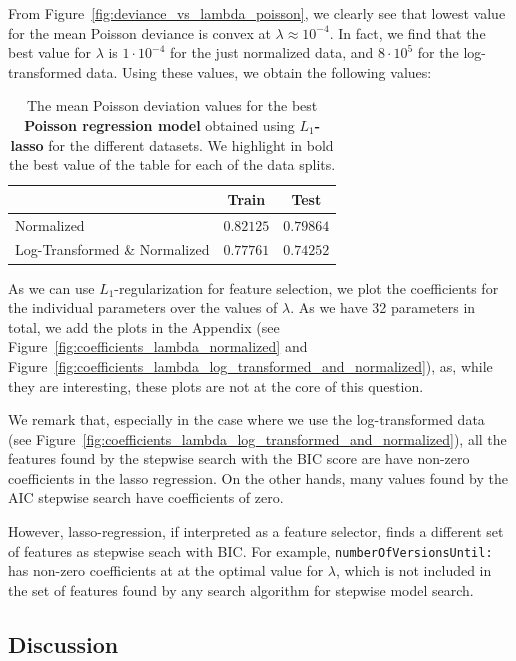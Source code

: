 From Figure~\ref{fig:deviance_vs_lambda_poisson}, we clearly see that lowest value for the mean Poisson deviance is convex at $\lambda \approx 10^{-4}$. In fact, we find that the best value for $\lambda$ is $1\cdot 10^{-4}$ for the just normalized data, and $8\cdot 10^{5}$ for the log-transformed data.
Using these values, we obtain the following values:
\begin{table}[htbp]
    \centering
    \begin{tabular}{l|cc}
         \toprule
         & Train & Test \\
         \midrule
         Normalized & $0.82125$ & $0.79864$ \\
         Log-Transformed \& Normalized & $\mathbf{0.77761}$ & $\mathbf{0.74252}$ \\
         \bottomrule
    \end{tabular}
    \caption{The mean Poisson deviation values for the best \textbf{Poisson regression model} obtained using \textbf{$L_1$-lasso} for the different datasets. We highlight in bold the best value of the table for each of the data splits.}
    \label{tab:deviation_poisson_l1}
\end{table}

As we can use $L_1$-regularization for feature selection, we plot the coefficients for the individual parameters over the values of $\lambda$. As we have 32 parameters in total, we add the plots in the Appendix (see Figure~\ref{fig:coefficients_lambda_normalized} and Figure~\ref{fig:coefficients_lambda_log_transformed_and_normalized}), as, while they are interesting, these plots are not at the core of this question. 

We remark that, especially in the case where we use the log-transformed data (see Figure~\ref{fig:coefficients_lambda_log_transformed_and_normalized}), all the features found by the stepwise search with the BIC score are have non-zero coefficients in the lasso regression. On the other hands, many values found by the AIC stepwise search have coefficients of zero.

However, lasso-regression, if interpreted as a feature selector, finds a different set of features as stepwise seach with BIC. For example, \texttt{numberOfVersionsUntil:} has non-zero coefficients at at the optimal value for $\lambda$, which is not included in the set of features found by any search algorithm for stepwise model search.

\subsection{Discussion}

